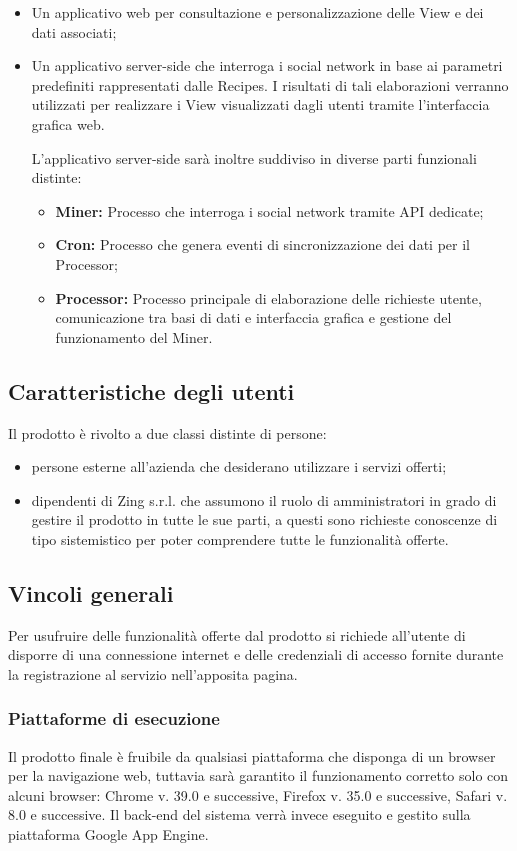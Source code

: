 \begin{itemize}
\item Un applicativo web per consultazione e personalizzazione delle View e dei dati associati;
\item Un applicativo server-side che interroga i social network in base ai parametri predefiniti rappresentati dalle Recipes. I risultati di tali elaborazioni verranno utilizzati per realizzare i View visualizzati dagli utenti tramite l'interfaccia grafica web.

L'applicativo server-side sarà inoltre suddiviso in diverse parti funzionali distinte:
\begin{itemize}
\item \textbf{Miner:} Processo che interroga i social network tramite API dedicate;
\item \textbf{Cron:} Processo che genera eventi di sincronizzazione dei dati per il Processor;
\item \textbf{Processor:} Processo principale di elaborazione delle richieste utente, comunicazione tra basi di dati e interfaccia grafica e gestione del funzionamento del Miner.
\end{itemize}

\end{itemize}

\subsection{Caratteristiche degli utenti}
Il prodotto è rivolto a due classi distinte di persone:

\begin{itemize}
\item persone esterne all'azienda che desiderano utilizzare i servizi offerti;
\item dipendenti di Zing s.r.l. che assumono il ruolo di amministratori in grado di gestire il prodotto in tutte le sue parti, a questi sono richieste conoscenze di tipo sistemistico per poter comprendere tutte le funzionalità offerte.
\end{itemize}


\subsection{Vincoli generali}
Per usufruire delle funzionalità offerte dal prodotto si richiede all'utente di disporre
di una connessione internet e delle credenziali di accesso fornite durante la registrazione al servizio nell'apposita pagina.

\subsubsection{Piattaforme di esecuzione}
Il prodotto finale è fruibile da qualsiasi piattaforma che disponga di un browser per la navigazione web, tuttavia sarà garantito il funzionamento corretto solo con alcuni browser: Chrome v. 39.0 e successive, Firefox v. 35.0 e successive, Safari v. 8.0 e successive.
Il back-end del sistema verrà invece eseguito e gestito sulla piattaforma Google App Engine.